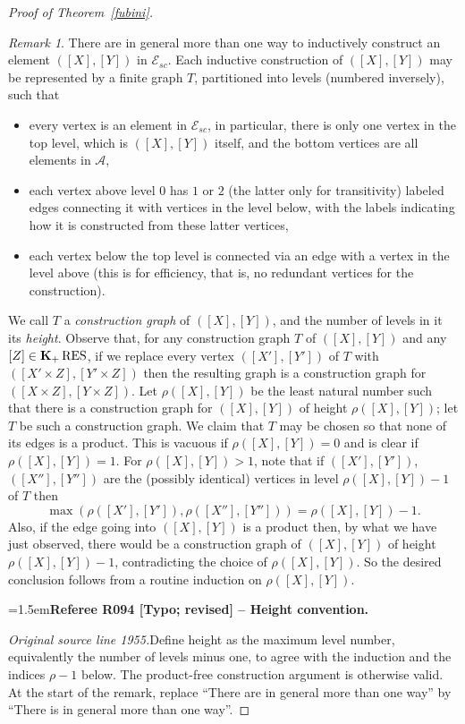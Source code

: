 \documentclass[12pt]{amsart}
\newcommand{\RefereeRemark}[4]{%
  \par\medskip\begingroup\normalfont\small\color{RefereePurple}%
  \emergencystretch=1.5em\noindent\textbf{Referee R#1 [#2] -- #3.}\par\nobreak\noindent #4\par
  \endgroup\medskip
}
\newcommand{\memph}[1]{{\color{magenta}\emph{#1}}}
\theoremstyle{plain}
\theoremstyle{definition}
\theoremstyle{remark}
\newtheorem{rem}[thm]{Remark}
\numberwithin{equation}{section}
\theoremstyle{plain}
\newcommand{\0}{\emptyset}
\newcommand{\mdl}[1]{\mathcal{#1}}  %
\newcommand{\RES}{\textup{RES}}
\DeclareMathOperator{\gsk}{\mathbf{K}_+}
\begin{document}
\begin{proof}[Proof of Theorem~\ref{fubini}]
\begin{rem}
There are in general more than one way to inductively construct an element $([X], [Y])$ in $\mdl E_{sc}$. Each inductive construction of $([X], [Y])$ may be represented by a finite graph $T$, partitioned into levels (numbered inversely), such that
\begin{itemize}
  \item every vertex is an element in $\mdl E_{sc}$, in particular, there is only one vertex in the top level, which is $([X], [Y])$ itself, and the bottom vertices are all elements in $\mdl A$,
  \item each vertex above level $0$ has $1$ or $2$ (the latter only for transitivity) labeled edges connecting it with vertices in the level below, with the labels indicating how it is constructed from these latter vertices,
  \item each vertex below the top level is connected via an edge with a vertex in the level above (this is for efficiency, that is, no redundant vertices for the construction).
\end{itemize}
We call $T$ a \memph{construction graph} of $([X], [Y])$, and the number of levels in it its \memph{height}. Observe that, for any construction graph $T$ of $([X], [Y])$ and any $[Z] \in \gsk \RES$, if we replace every vertex $([X'], [Y'])$ of $T$ with $([X' \times Z], [Y' \times Z])$ then the resulting graph is a construction graph for $([X \times Z], [Y \times Z])$. Let $\rho([X], [Y])$ be the least natural number such that there is a construction graph for $([X], [Y])$ of height $\rho([X], [Y])$; let $T$ be such a construction graph. We claim that $T$ may be chosen so that  none of its edges is a product. This is vacuous if $\rho([X], [Y]) = 0$ and is clear if $\rho([X], [Y]) = 1$. For $\rho([X], [Y]) > 1$, note that if $([X'], [Y'])$, $([X''], [Y''])$ are the (possibly identical) vertices in level $\rho([X], [Y]) - 1$ of $T$ then
\[
\max(\rho([X'], [Y']), \rho([X''], [Y''])) = \rho([X], [Y]) - 1.
\]
Also, if the edge going into $([X], [Y])$ is a product then, by what we have just observed, there would be a construction graph of $([X], [Y])$ of height $\rho([X], [Y]) - 1$, contradicting the choice of $\rho([X], [Y])$. So the desired conclusion follows from a routine induction on $\rho([X], [Y])$.
\end{rem}

\RefereeRemark{094}{Typo; revised}{Height convention}{%
\textit{Original source line 1955.}\quad Define height as the maximum level number, equivalently the number of levels minus one, to agree with the induction and the indices $\rho-1$ below. The product-free construction argument is otherwise valid. At the start of the remark, replace ``There are in general more than one way'' by ``There is in general more than one way''. 
}



\end{proof}
\end{document}
